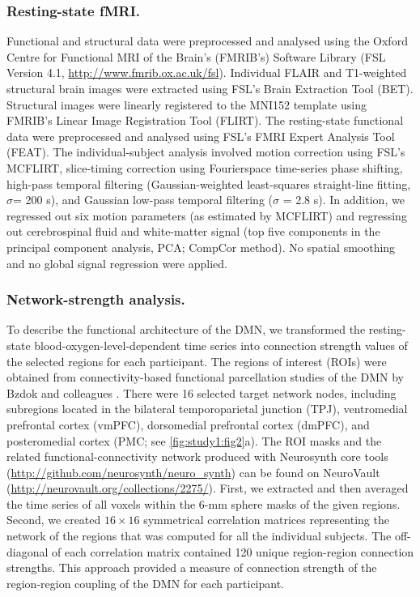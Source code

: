 \subsubsection{Resting-state fMRI.}

Functional and structural data were preprocessed and analysed using the Oxford Centre for Functional MRI of the Brain's (FMRIB's) Software Library (FSL Version 4.1, \url{http://www.fmrib.ox.ac.uk/fsl}).
Individual FLAIR and T1-weighted structural brain images were extracted using FSL's Brain Extraction Tool (BET). Structural images were linearly registered to the MNI152 template using FMRIB's Linear Image Registration Tool (FLIRT). The resting-state functional data were preprocessed and analysed using FSL's FMRI Expert Analysis Tool (FEAT). The individual-subject analysis involved motion correction using FSL's MCFLIRT, slice-timing correction using Fourierspace time-series phase shifting, high-pass temporal filtering (Gaussian-weighted least-squares straight-line fitting, \(\sigma\)= 200 s), and Gaussian low-pass temporal filtering (\(\sigma\) = 2.8 s). In addition, we regressed out six motion parameters (as estimated by MCFLIRT) and regressing out cerebrospinal fluid and white-matter signal (top five components in the principal component analysis, PCA; CompCor method). No spatial smoothing and no global signal regression were applied.

\subsubsection{Network-strength analysis.}

To describe the functional architecture of the DMN, we transformed the resting-state blood-oxygen-level-dependent time series into connection strength values of the selected regions for each participant. The regions of interest (ROIs) were obtained from connectivity-based functional parcellation studies of the DMN by Bzdok and colleagues
\cite{BzdokNI2013,Bzdok2015,Bzdok2016,Eickhoff2016,Eickhoff2016}.
There were 16 selected target network nodes, including subregions located in the bilateral temporoparietal junction (TPJ), ventromedial prefrontal cortex (vmPFC), dorsomedial prefrontal cortex (dmPFC), and posteromedial cortex
(PMC; see \cref{fig:study1:fig2}a).
The ROI masks and the related functional-connectivity network produced with Neurosynth core tools
(\url{http://github.com/neurosynth/neuro_synth})
can be found on NeuroVault
(\url{http://neurovault.org/collections/2275/}). First, we extracted and then averaged the time series of all voxels within the 6-mm sphere masks of the given regions. Second, we created \(16\times16\) symmetrical correlation matrices representing the network of the regions that was computed for all the individual subjects. The off-diagonal of each correlation matrix contained 120 unique region-region connection strengths. This approach provided a measure of connection strength of the region-region coupling of the DMN for each participant.

